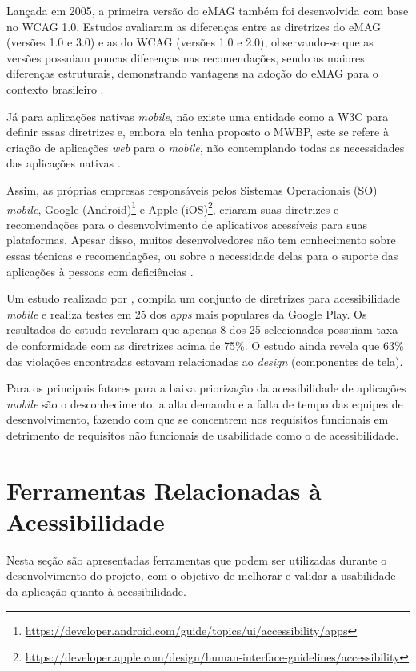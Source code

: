Lançada em 2005, a primeira versão do eMAG também foi desenvolvida com base no WCAG 1.0. Estudos avaliaram as diferenças entre as diretrizes do eMAG
(versões 1.0 e 3.0) e as do WCAG (versões 1.0 e 2.0), observando-se que as versões possuiam poucas
diferenças nas recomendações, sendo as maiores diferenças estruturais, demonstrando vantagens na adoção do eMAG para o
contexto brasileiro \cite{Bach_2009,Rocha_2013}.

Já para aplicações nativas \textit{mobile}, não existe uma entidade como a W3C para definir essas diretrizes e, embora
ela tenha proposto o MWBP, este se refere à criação de aplicações \emph{web} para o \emph{mobile}, não contemplando todas
as necessidades das aplicações nativas \cite{W3C_2008}.

Assim, as próprias empresas responsáveis pelos Sistemas Operacionais (SO) \emph{mobile}, Google (Android)\footnote{\url{https://developer.android.com/guide/topics/ui/accessibility/apps}}
e Apple (iOS)\footnote{\url{https://developer.apple.com/design/human-interface-guidelines/accessibility}},
criaram suas diretrizes e recomendações para o desenvolvimento de aplicativos acessíveis para suas plataformas.
Apesar disso, muitos desenvolvedores não tem conhecimento sobre essas técnicas e recomendações, ou sobre a necessidade delas
para o suporte das aplicações à pessoas com deficiências \cite{Quispe2020,Bi2021}.

Um estudo realizado por , compila um conjunto de diretrizes para acessibilidade \textit{mobile} e realiza
testes em 25 dos \textit{apps} mais populares da Google Play. Os resultados do estudo revelaram que apenas 8 dos 25 selecionados
possuiam taxa de conformidade com as diretrizes acima de 75\%. O estudo ainda revela que 63\% das violações encontradas estavam
relacionadas ao \textit{design} (componentes de tela).

Para  os principais fatores para a baixa priorização da acessibilidade de aplicações \textit{mobile}
são o desconhecimento, a alta demanda e a falta de tempo das equipes de desenvolvimento, fazendo com que se concentrem nos
requisitos funcionais em detrimento de requisitos não funcionais de usabilidade como o de acessibilidade.

\section{Ferramentas Relacionadas à Acessibilidade}
Nesta seção são apresentadas ferramentas que podem ser utilizadas durante o desenvolvimento do projeto, com o objetivo de melhorar e validar a usabilidade
da aplicação quanto à acessibilidade.


